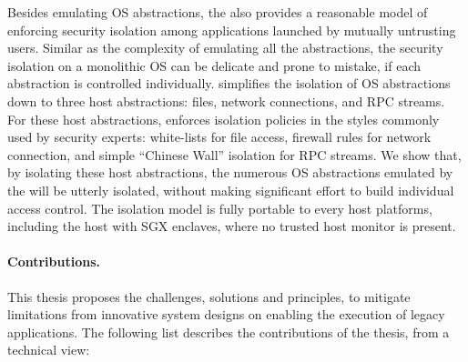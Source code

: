 Besides emulating OS abstractions, the \graphene{} \libos{} also provides a reasonable model of enforcing security isolation among applications launched by mutually untrusting users.
Similar as the complexity of emulating all the abstractions,
the security isolation on a monolithic OS can be delicate and prone to mistake,
if each abstraction is controlled individually.
\graphene{} simplifies the isolation of OS abstractions
down to three host abstractions: files, network connections, and RPC streams.
For these host abstractions, \graphene{} enforces isolation policies in the styles
commonly used by security experts:
white-lists for file access, firewall rules for network connection,
and simple ``Chinese Wall'' isolation for RPC streams.
We show that, by isolating these host abstractions,
the numerous OS abstractions emulated by the \liboses{} will be utterly isolated,
without making significant effort to build individual access control.
The isolation model is fully portable to every host platforms,
including the host with SGX enclaves, where no trusted host monitor is present.




\paragraph{Contributions.}
This thesis proposes the challenges, solutions and principles,
to mitigate limitations from innovative system designs on enabling the execution of legacy applications.
The following list describes the contributions of the thesis,
from a technical view:

